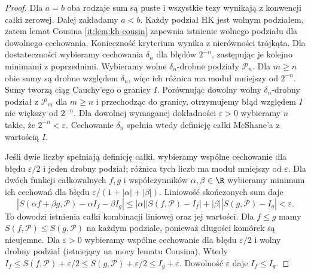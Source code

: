 \begin{proof}
Dla $a=b$ oba rodzaje sum są puste i wszystkie tezy wynikają z konwencji całki zerowej. Dalej zakładamy $a<b$. Każdy podział HK jest wolnym podziałem, zatem lemat Cousina
\ref{it:lem:kh-cousin} zapewnia istnienie wolnego podziału
dla dowolnego cechowania. Konieczność kryterium wynika
z nierówności trójkąta. Dla dostateczności wybieramy cechowania
$\delta_n$ dla błędów $2^{-n}$, zastępując je kolejno
minimami z poprzednimi. Wybieramy wolne $\delta_n$-drobne
podziały $\mathcal P_n$. Dla $m\ge n$ obie sumy są drobne
względem $\delta_n$, więc ich różnica ma moduł mniejszy
od $2^{-n}$. Sumy tworzą ciąg Cauchy'ego o granicy $I$.
Porównując dowolny wolny $\delta_n$-drobny podział
z $\mathcal P_m$ dla $m\ge n$ i przechodząc do granicy,
otrzymujemy błąd względem $I$ nie większy od $2^{-n}$. Dla dowolnej wymaganej dokładności $\varepsilon>0$ wybieramy $n$ takie, że $2^{-n}<\varepsilon$. Cechowanie $\delta_n$ spełnia wtedy definicję całki McShane'a z wartością $I$.

Jeśli dwie liczby spełniają definicję całki, wybieramy
wspólne cechowanie dla błędu $\varepsilon/2$ i jeden drobny
podział; różnica tych liczb ma moduł mniejszy od $\varepsilon$.
Dla dwóch funkcji całkowalnych $f,g$ i współczynników $\alpha,\beta\in\R$ wybieramy minimum ich cechowań dla błędu $\varepsilon/(1+|\alpha|+|\beta|)$. Liniowość skończonych sum daje
\[
 |S(\alpha f+\beta g,\mathcal P)-\alpha I_f-\beta I_g|
 \le |\alpha||S(f,\mathcal P)-I_f|
     +|\beta||S(g,\mathcal P)-I_g|<\varepsilon.
\]
To dowodzi istnienia całki kombinacji liniowej oraz jej wartości.
Dla $f\le g$ mamy $S(f,\mathcal P)\le S(g,\mathcal P)$
na każdym podziale, ponieważ długości komórek są nieujemne.
Dla $\varepsilon>0$ wybieramy wspólne cechowanie dla błędu $\varepsilon/2$ i wolny drobny podział (istniejący na mocy lematu Cousina). Wtedy $I_f\le S(f,\mathcal P)+\varepsilon/2\le S(g,\mathcal P)+\varepsilon/2\le I_g+\varepsilon$. Dowolność $\varepsilon$ daje $I_f\le I_g$.
\end{proof}

